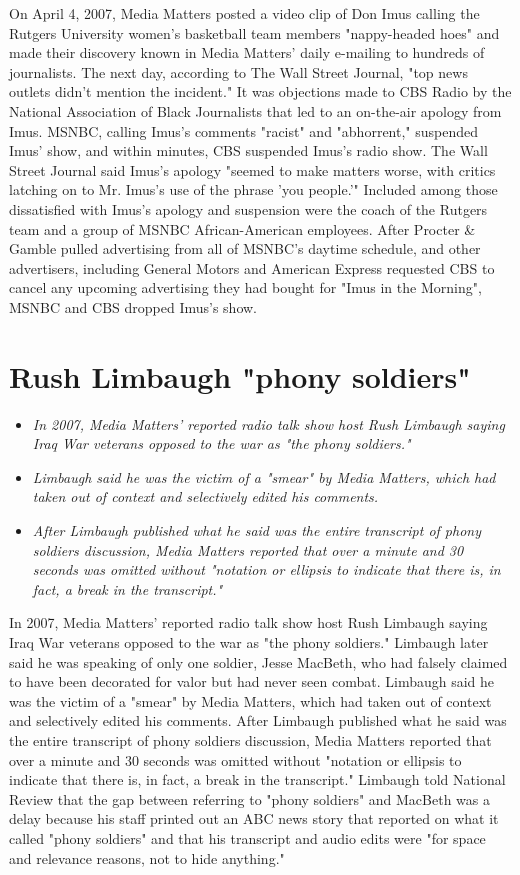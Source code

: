 On April 4, 2007, Media Matters posted a video clip of Don Imus calling
the Rutgers University women's basketball team members "nappy-headed
hoes" and made their discovery known in Media Matters' daily e-mailing
to hundreds of journalists. The next day, according to The Wall Street
Journal, "top news outlets didn't mention the incident." It was
objections made to CBS Radio by the National Association of Black
Journalists that led to an on-the-air apology from Imus. MSNBC, calling
Imus's comments "racist" and "abhorrent," suspended Imus' show, and
within minutes, CBS suspended Imus's radio show. The Wall Street Journal
said Imus's apology "seemed to make matters worse, with critics latching
on to Mr. Imus's use of the phrase 'you people.'" Included among those
dissatisfied with Imus's apology and suspension were the coach of the
Rutgers team and a group of MSNBC African-American employees. After
Procter \& Gamble pulled advertising from all of MSNBC's daytime
schedule, and other advertisers, including General Motors and American
Express requested CBS to cancel any upcoming advertising they had bought
for "Imus in the Morning", MSNBC and CBS dropped Imus's show.

\section{Rush Limbaugh "phony
soldiers"}\label{rush-limbaugh-phony-soldiers}

\begin{itemize}
\item
  \emph{In 2007, Media Matters' reported radio talk show host Rush
  Limbaugh saying Iraq War veterans opposed to the war as "the phony
  soldiers."}
\item
  \emph{Limbaugh said he was the victim of a "smear" by Media Matters,
  which had taken out of context and selectively edited his comments.}
\item
  \emph{After Limbaugh published what he said was the entire transcript
  of phony soldiers discussion, Media Matters reported that over a
  minute and 30 seconds was omitted without "notation or ellipsis to
  indicate that there is, in fact, a break in the transcript."}
\end{itemize}

In 2007, Media Matters' reported radio talk show host Rush Limbaugh
saying Iraq War veterans opposed to the war as "the phony soldiers."
Limbaugh later said he was speaking of only one soldier, Jesse MacBeth,
who had falsely claimed to have been decorated for valor but had never
seen combat. Limbaugh said he was the victim of a "smear" by Media
Matters, which had taken out of context and selectively edited his
comments. After Limbaugh published what he said was the entire
transcript of phony soldiers discussion, Media Matters reported that
over a minute and 30 seconds was omitted without "notation or ellipsis
to indicate that there is, in fact, a break in the transcript." Limbaugh
told National Review that the gap between referring to "phony soldiers"
and MacBeth was a delay because his staff printed out an ABC news story
that reported on what it called "phony soldiers" and that his transcript
and audio edits were "for space and relevance reasons, not to hide
anything."

